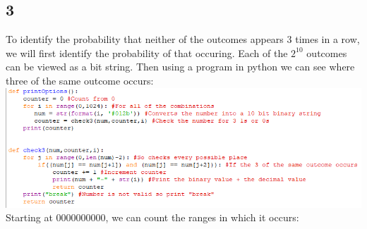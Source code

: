 \documentclass{article}
\begin{document}
	\subsection*{3}
	To identify the probability that neither of the outcomes appears 3 times in a row, we will first identify the probability of that occuring. 
	\newline
	Each of the  $2^{10}$ outcomes can be viewed as a bit string.
	\newline
	Then using a program in python we can see where three of the same outcome occurs:
	\newline
	\includegraphics[width=\textwidth]{Pycode}
	\newline
	Starting at 0000000000, we can count the ranges in which it occurs:
\end{document}
